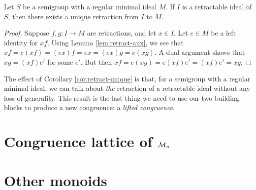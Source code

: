 \begin{corollary}
  \label{cor:retract-unique}
  Let $S$ be a semigroup with a regular minimal ideal $M$.  If $I$ is a
  retractable ideal of $S$, then there exists a unique retraction from $I$ to
  $M$.
  \begin{proof}
    Suppose $f,g:I\to M$ are retractions, and let $x\in I$.  Let $e\in M$ be a
    left identity for $xf$.  Using Lemma \ref{lem:retract-aux}, we see that
    $xf = e (xf) = (ex)f = ex = (ex)g = e (xg)$.  A dual argument shows that
    $xg=(xf) e'$ for some $e'$.  But then $xf = e (xg) = e (xf) e' = (xf)e'=xg$.
  \end{proof}
\end{corollary}

The effect of Corollary \ref{cor:retract-unique} is that, for a semigroup with a
regular minimal ideal, we can talk about \textit{the} retraction of a
retractable ideal without any loss of generality.  This result is the last thing
we need to use our two building blocks to produce a new congruence: a
\textit{lifted congruence}.

\section{Congruence lattice of $\mathcal{M}_n$}
\label{sec:motzkin-congs}


\section{Other monoids}
\label{sec:motzkin-other}

